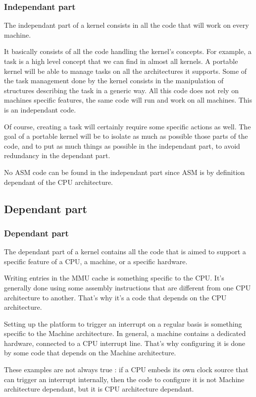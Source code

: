 \begin{frame}
  \frametitle{Independant part}

  The independant part of a kernel consists in all the code that will work on every machine.

  \-

  It basically consists of all the code handling the kernel's concepts. For example, a task is a high level concept that we can find in almost all kernels. A portable kernel will be able to manage tasks on all the architectures it supports. Some of the task management done by the kernel consists in the manipulation of structures describing the task in a generic way. All this code does not rely on machines specific features, the same code will run and work on all machines. This is an independant code.

  \-

  Of course, creating a task will certainly require some specific actions as well. The goal of a portable kernel will be to isolate as much as possible those parts of the code, and to put as much things as possible in the independant part, to avoid redundancy in the dependant part.

  \-

  No ASM code can be found in the independant part since ASM is by definition dependant of the CPU architecture.

\end{frame}

\subsection{Dependant part}

\begin{frame}
  \frametitle{Dependant part}

  The dependant part of a kernel contains all the code that is aimed to support a specific feature of a CPU, a machine, or a specific hardware.

  \-

  Writing entries in the MMU cache is something specific to the CPU. It's generally done using some assembly instructions that are different from one CPU architecture to another. That's why it's a code that depends on the CPU architecture.

  \-

  Setting up the platform to trigger an interrupt on a regular basis is something specific to the Machine architecture. In general, a machine contains a dedicated hardware, connected to a CPU interrupt line. That's why configuring it is done by some code that depends on the Machine architecture.

  \-

  These examples are not always true : if a CPU embeds its own clock source that can trigger an interrupt internally, then the code to configure it is not Machine architecture dependant, but it is CPU architecture dependant.

\end{frame}

